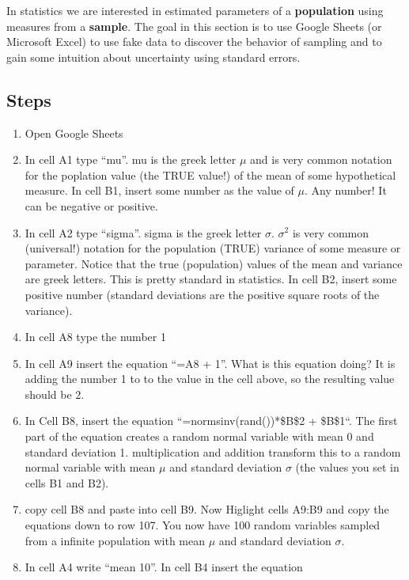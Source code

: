 \documentclass[]{book}
\providecommand{\tightlist}{%
  \setlength{\itemsep}{0pt}\setlength{\parskip}{0pt}}
\theoremstyle{definition}
\theoremstyle{definition}
\theoremstyle{definition}
\theoremstyle{remark}
\begin{document}
In statistics we are interested in estimated parameters of a
\textbf{population} using measures from a \textbf{sample}. The goal in
this section is to use Google Sheets (or Microsoft Excel) to use fake
data to discover the behavior of sampling and to gain some intuition
about uncertainty using standard errors.

\subsection{Steps}\label{steps}

\begin{enumerate}
\def\labelenumi{\arabic{enumi}.}
\tightlist
\item
  Open Google Sheets
\item
  In cell A1 type ``mu''. mu is the greek letter \(\mu\) and is very
  common notation for the poplation value (the TRUE value!) of the mean
  of some hypothetical measure. In cell B1, insert some number as the
  value of \(\mu\). Any number! It can be negative or positive.
\item
  In cell A2 type ``sigma''. sigma is the greek letter \(\sigma\).
  \(\sigma^2\) is very common (universal!) notation for the population
  (TRUE) variance of some measure or parameter. Notice that the true
  (population) values of the mean and variance are greek letters. This
  is pretty standard in statistics. In cell B2, insert some positive
  number (standard deviations are the positive square roots of the
  variance).
\item
  In cell A8 type the number 1
\item
  In cell A9 insert the equation ``=A8 + 1''. What is this equation
  doing? It is adding the number 1 to to the value in the cell above, so
  the resulting value should be 2.
\item
  In Cell B8, insert the equation ``=normsinv(rand())*\$B\$2 + \$B\$1``.
  The first part of the equation creates a random normal variable with
  mean 0 and standard deviation 1. multiplication and addition transform
  this to a random normal variable with mean \(\mu\) and standard
  deviation \(\sigma\) (the values you set in cells B1 and B2).
\item
  copy cell B8 and paste into cell B9. Now Higlight cells A9:B9 and copy
  the equations down to row 107. You now have 100 random variables
  sampled from a infinite population with mean \(\mu\) and standard
  deviation \(\sigma\).
\item
  In cell A4 write ``mean 10''. In cell B4 insert the equation

\end{enumerate}
\end{document}
